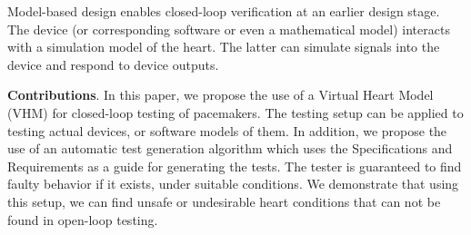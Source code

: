 Model-based design enables closed-loop verification at an earlier design stage. 
The device (or corresponding software or even a mathematical model) interacts with a simulation model of the heart.
The latter can simulate signals into the device and respond to device outputs. 

\textbf{Contributions}. 
In this paper, we propose the use of a Virtual Heart Model (VHM) for closed-loop testing of pacemakers.
The testing setup can be applied to testing actual devices, or software models of them.
In addition, we propose the use of an automatic test generation algorithm which uses the Specifications and Requirements as a guide for generating the tests.
The tester is guaranteed to find faulty behavior if it exists, under suitable conditions. 
We demonstrate that using this setup, we can find unsafe or undesirable heart conditions that can not be found in open-loop testing.

